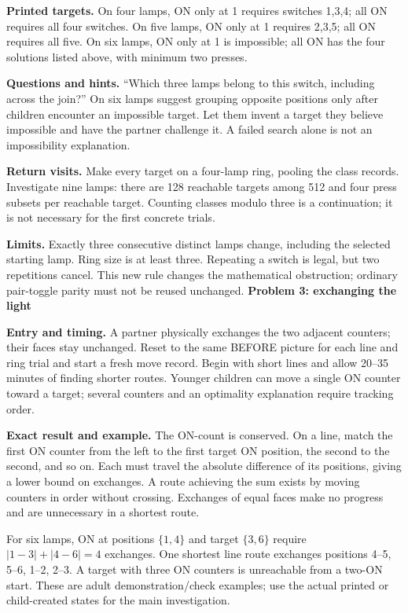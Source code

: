 \documentclass[11pt]{article}
\newcommand\lead[1]{\textbf{#1}\par}
\begin{document}
\textbf{Printed targets.} On four lamps, ON only at 1 requires switches 1,3,4; all ON requires all four switches. On five lamps, ON only at 1 requires 2,3,5; all ON requires all five. On six lamps, ON only at 1 is impossible; all ON has the four solutions listed above, with minimum two presses.

\textbf{Questions and hints.} ``Which three lamps belong to this switch, including across the join?'' On six lamps suggest grouping opposite positions only after children encounter an impossible target. Let them invent a target they believe impossible and have the partner challenge it. A failed search alone is not an impossibility explanation.

\textbf{Return visits.} Make every target on a four-lamp ring, pooling the class records. Investigate nine lamps: there are 128 reachable targets among 512 and four press subsets per reachable target. Counting classes modulo three is a continuation; it is not necessary for the first concrete trials.

\textbf{Limits.} Exactly three consecutive distinct lamps change, including the selected starting lamp. Ring size is at least three. Repeating a switch is legal, but two repetitions cancel. This new rule changes the mathematical obstruction; ordinary pair-toggle parity must not be reused unchanged.
\newpage
\lead{Problem 3: exchanging the light}
\textbf{Entry and timing.} A partner physically exchanges the two adjacent counters; their faces stay unchanged. Reset to the same BEFORE picture for each line and ring trial and start a fresh move record. Begin with short lines and allow 20--35 minutes of finding shorter routes. Younger children can move a single ON counter toward a target; several counters and an optimality explanation require tracking order.

\textbf{Exact result and example.} The ON-count is conserved. On a line, match the first ON counter from the left to the first target ON position, the second to the second, and so on. Each must travel the absolute difference of its positions, giving a lower bound on exchanges. A route achieving the sum exists by moving counters in order without crossing. Exchanges of equal faces make no progress and are unnecessary in a shortest route.

For six lamps, ON at positions $\{1,4\}$ and target $\{3,6\}$ require $|1-3|+|4-6|=4$ exchanges. One shortest line route exchanges positions 4--5, 5--6, 1--2, 2--3. A target with three ON counters is unreachable from a two-ON start. These are adult demonstration/check examples; use the actual printed or child-created states for the main investigation.
\end{document}
